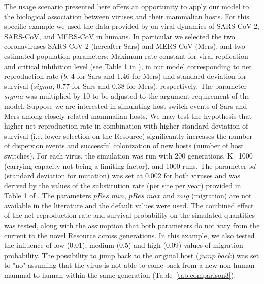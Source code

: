 The usage scenario presented here offers an opportunity to apply our model to the biological association between viruses and their mammalian hosts. For this specific example we used the data provided by \citet{kim2021quantitative} on viral dynamics of SARS-CoV-2, SARS-CoV, and MERS-CoV in humans. In particular we selected the two coronaviruses SARS-CoV-2 (hereafter Sars) and MERS-CoV (Mers), and two estimated population parameters: Maximum rate constant for viral replication and critical inhibition level (see Table 1 in \citet{kim2021quantitative}), in our model corresponding to net reproduction rate ($b$, 4 for Sars and 1.46 for Mers) and standard deviation for survival ($sigma$, 0.77 for Sars and 0.38 for Mers), respectively. The parameter $sigma$ was multiplied by 10 to be adjusted to the argument requirement of the model.
Suppose we are interested in simulating host switch events of Sars and Mers among closely related mammalian hosts. We may test the hypothesis that higher net reproduction rate in combination with higher standard deviation of survival (i.e. lower selection on the Resource) significantly increases the number of dispersion events and successful colonization of new hosts (number of host switches). For each virus, the simulation was run with 200 generations, K=1000 (carrying capacity not being a limiting factor), and 1000 runs. The parameter $sd$ (standard deviation for mutation) was set at 0.002 for both viruses and was derived by the values of the substitution rate (per site per year) provided in Table 1 of \citet{van2020emergence}. The parameters $pRes\_min$, $pRes\_max$ and $mig$ (migration) are not available in the literature and the default values were used. The combined effect of the net reproduction rate and survival probability on the simulated quantities was tested, along with the assumption that both parameters do not vary from the current to the novel Resource across generations.
In this example, we also tested the influence of low (0.01), medium (0.5) and high (0.09) values of migration probability. The possibility to jump back to the original host ($jump\_back$) was set to "no" assuming that the virus is not able to come back from a new non-human mammal to human within the same generation (Table~\ref{tab:comparison3}).


